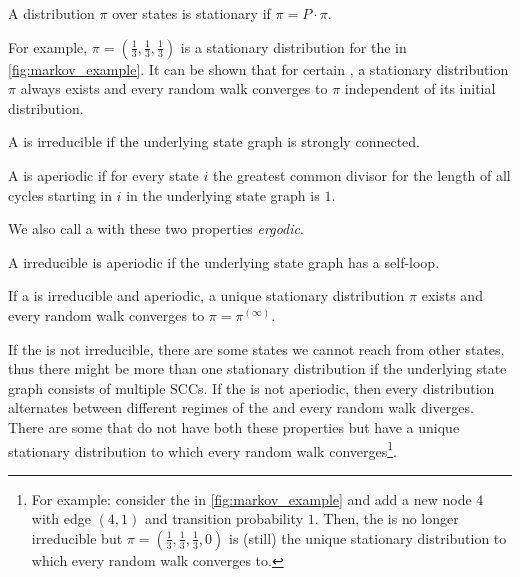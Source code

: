 \begin{definition}
  A distribution $\pi$ over states is stationary if $\pi = P \cdot \pi$.
\end{definition}

\noindent For example, $\pi = \left(\frac{1}{3}, \frac{1}{3}, \frac{1}{3}\right)$ is a stationary distribution for the \markov in \cref{fig:markov_example}.
It can be shown that for certain \markovs, a stationary distribution $\pi$ always exists and every random walk converges to $\pi$ independent of its initial distribution.

\begin{definition}[Irreducible]
  A \markov is irreducible if the underlying state graph is strongly connected.
\end{definition}

\begin{definition}[Aperiodic]
  A \markov is aperiodic if for every state $i$ the greatest common divisor for the length of all cycles starting in $i$ in the underlying state graph is $1$.
\end{definition}

\noindent We also call a \markov with these two properties \emph{ergodic}.

\begin{observation}\label{obs:loop_implies_aperiodic}
  A irreducible \markov is aperiodic if the underlying state graph has a self-loop.
\end{observation}

\begin{lemma}
  If a \markov is irreducible and aperiodic, a unique stationary distribution $\pi$ exists and every random walk converges to $\pi = \pi^{(\infty)}$.
\end{lemma}

If the \markov is not irreducible, there are some states we cannot reach from other states, thus there might be more than one stationary distribution if the underlying state graph consists of multiple SCCs.
If the \markov is not aperiodic, then every distribution alternates between different regimes of the \markov and every random walk diverges.
There are some \markovs that do not have both these properties but have a unique stationary distribution to which every random walk converges\footnote{
  For example: consider the \markov in \cref{fig:markov_example} and add a new node $4$ with edge $(4, 1)$ and transition probability $1$.
  Then, the \markov is no longer irreducible but $\pi = \left(\frac{1}{3}, \frac{1}{3}, \frac{1}{3}, 0\right)$ is (still) the unique stationary distribution to which every random walk converges to.
}.

